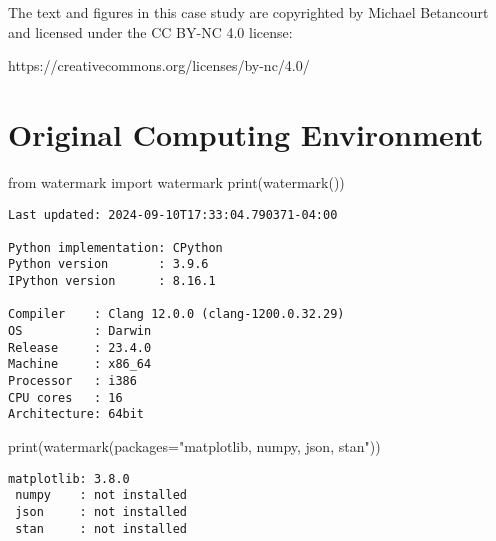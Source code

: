 \documentclass[
  letterpaper,
  DIV=11,
  numbers=noendperiod]{scrartcl}
\newenvironment{Shaded}{\begin{snugshade}}{\end{snugshade}}
\newcommand{\BuiltInTok}[1]{\textcolor[rgb]{0.00,0.23,0.31}{#1}}
\newcommand{\ImportTok}[1]{\textcolor[rgb]{0.00,0.46,0.62}{#1}}
\newcommand{\NormalTok}[1]{\textcolor[rgb]{0.00,0.23,0.31}{#1}}
\newcommand{\OperatorTok}[1]{\textcolor[rgb]{0.37,0.37,0.37}{#1}}
\newcommand{\StringTok}[1]{\textcolor[rgb]{0.13,0.47,0.30}{#1}}
\begin{document}
The text and figures in this case study are copyrighted by Michael
Betancourt and licensed under the CC BY-NC 4.0 license:

https://creativecommons.org/licenses/by-nc/4.0/

\section*{Original Computing
Environment}\label{original-computing-environment}

\begin{Shaded}
\begin{Highlighting}[]
\ImportTok{from}\NormalTok{ watermark }\ImportTok{import}\NormalTok{ watermark}
\BuiltInTok{print}\NormalTok{(watermark())}
\end{Highlighting}
\end{Shaded}

\begin{verbatim}
Last updated: 2024-09-10T17:33:04.790371-04:00

Python implementation: CPython
Python version       : 3.9.6
IPython version      : 8.16.1

Compiler    : Clang 12.0.0 (clang-1200.0.32.29)
OS          : Darwin
Release     : 23.4.0
Machine     : x86_64
Processor   : i386
CPU cores   : 16
Architecture: 64bit
\end{verbatim}

\begin{Shaded}
\begin{Highlighting}[]
\BuiltInTok{print}\NormalTok{(watermark(packages}\OperatorTok{=}\StringTok{"matplotlib, numpy, json, stan"}\NormalTok{))}
\end{Highlighting}
\end{Shaded}

\begin{verbatim}
matplotlib: 3.8.0
 numpy    : not installed
 json     : not installed
 stan     : not installed
\end{verbatim}
\end{document}
